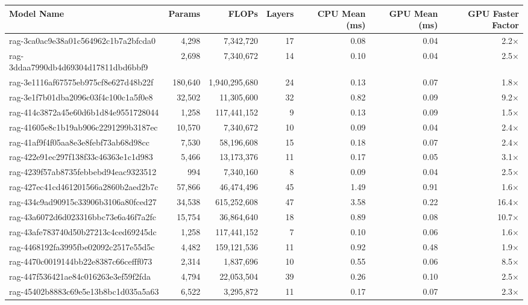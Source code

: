 \begin{table}[h!]
\centering
\fontsize{7}{9}\selectfont
\begin{tabular}{lrrrrrr}
\toprule
\textbf{Model Name} & \textbf{Params} & \textbf{FLOPs} & \textbf{Layers} & \textbf{CPU Mean (ms)} & \textbf{GPU Mean (ms)} & \textbf{GPU Faster Factor} \\
\midrule
rag-3ca0ac9e38a01c564962c1b7a2bfcda0 & 4,298 & 7,342,720 & 17 & 0.08 & 0.04 & 2.2$\times$ \\
rag-3ddaa7990db4d69304d17811dbd6bbf9 & 2,698 & 7,340,672 & 14 & 0.10 & 0.04 & 2.5$\times$ \\
rag-3e1116af67575eb975cf8e627d48b22f & 180,640 & 1,940,295,680 & 24 & 0.13 & 0.07 & 1.8$\times$ \\
rag-3e1f7b01dba2096c03f4c100c1a5f0e8 & 32,502 & 11,305,600 & 32 & 0.82 & 0.09 & 9.2$\times$ \\
rag-414c3872a45e60d6b1d84e9551728044 & 1,258 & 117,441,152 & 9 & 0.13 & 0.09 & 1.5$\times$ \\
rag-41605e8c1b19ab906c2291299b3187ec & 10,570 & 7,340,672 & 10 & 0.09 & 0.04 & 2.4$\times$ \\
rag-41af9f4f05aa8e3e8febf73ab68d98cc & 7,530 & 58,196,608 & 15 & 0.18 & 0.07 & 2.4$\times$ \\
rag-422e91ec297f138f33c46363e1c1d983 & 5,466 & 13,173,376 & 11 & 0.17 & 0.05 & 3.1$\times$ \\
rag-4239f57ab8735febbebd94eac9323512 & 994 & 7,340,160 & 8 & 0.09 & 0.04 & 2.5$\times$ \\
rag-427ec41cd461201566a2860b2aed2b7c & 57,866 & 46,474,496 & 45 & 1.49 & 0.91 & 1.6$\times$ \\
rag-434c9ad90915c33906b3106a80fced27 & 34,538 & 615,252,608 & 47 & 3.58 & 0.22 & 16.4$\times$ \\
rag-43a6072d6d023316bbc73e6a46f7a2fc & 15,754 & 36,864,640 & 18 & 0.89 & 0.08 & 10.7$\times$ \\
rag-43afe783740d50b27213c4ced69245dc & 1,258 & 117,441,152 & 7 & 0.10 & 0.06 & 1.6$\times$ \\
rag-4468192fa3995fbe02092c2517e55d5c & 4,482 & 159,121,536 & 11 & 0.92 & 0.48 & 1.9$\times$ \\
rag-4470c0019144bb22e8387c66cefff073 & 2,314 & 1,837,696 & 10 & 0.55 & 0.06 & 8.5$\times$ \\
rag-447f536421ae84c016263e3ef59f2fda & 4,794 & 22,053,504 & 39 & 0.26 & 0.10 & 2.5$\times$ \\
rag-45402b8883c69e5e13b8bc1d035a5a63 & 6,522 & 3,295,872 & 11 & 0.17 & 0.07 & 2.3$\times$ \\

\end{tabular}
\end{table}
